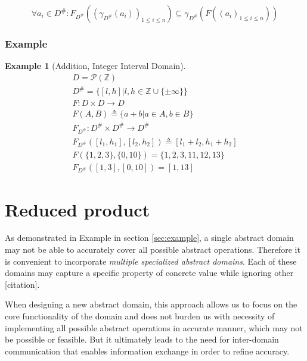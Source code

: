 \documentclass[12pt,oneside]{fithesis2}
\theoremstyle{definition}
\newtheorem{exmp}{Example}[section]
\begin{document}
\[
\forall a_i \in D^\#: F_{D^\#}((\gamma_{D^\#}(a_i))_{1 \le i \le n}) \subseteq \gamma_{D^\#}(F((a_i)_{1 \le i \le n}))
\]

\subsection{Example}

\begin{exmp}[Addition, Integer Interval Domain\cite{mine-WING12}]
  \begin{gather*}
    D = \mathcal P(\mathbb Z)\\
    D^\# = \{[l,h] | l,h \in \mathbb{Z} \cup \{\pm\infty\}\}\\
    F: D \times D \to D\\
    F(A,B) \triangleq \{a+b | a \in A, b \in B \}\\
    F_{D^\#}: D^\# \times D^\# \to D^\#\\
    F_{D^\#}([l_1, h_1], [l_2, h_2]) \triangleq [l_1 + l_2, h_1 + h_2]\\
    F(\{1,2,3\}, \{0,10\}) = \{1,2,3,11,12,13\}\\
    F_{D^\#}([1,3], [0,10]) = [1,13]
  \end{gather*}
\end{exmp}

\chapter{Reduced product}

As demonstrated in Example in section \ref{sec:example}, a single abstract domain may not be able to accurately cover all possible abstract operations. Therefore it is convenient to incorporate \textit{multiple specialized abstract domains}. Each of these domains may capture a specific property of concrete value while ignoring other [citation].

When designing a new abstract domain, this approach allows us to focus on the core functionality of the domain and does not burden us with necessity of implementing all possible abstract operations in accurate manner, which may not be possible or feasible. But it ultimately leads to the need for inter-domain communication that enables information exchange in order to refine accuracy.
\end{document}
